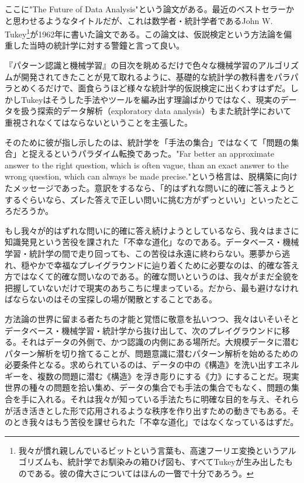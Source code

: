 ここに"The Future of Data Analysis"という論文がある。最近のベストセラーかと思わせるようなタイトルだが、これは数学者・統計学者であるJohn W. Tukey\footnote{我々が慣れ親しんでいるビットという言葉も、高速フーリエ変換というアルゴリズムも、統計学でお馴染みの箱ひげ図も、すべてTukeyが生み出したものである。彼の偉大さについてはほんの一瞥で十分であろう。}が1962年に書いた論文である。この論文は、仮説検定という方法論を偏重した当時の統計学に対する警鐘と言って良い。

『パターン認識と機械学習』の目次を眺めるだけで色々な機械学習のアルゴリズムが開発されてきたことが見て取れるように、基礎的な統計学の教科書をパラパラとめくるだけで、面食らうほど様々な統計学的仮説検定に出くわすはずだ。しかしTukeyはそうした手法やツールを編み出す理論ばかりではなく、現実のデータを扱う探索的データ解析（exploratory data analysis）もまた統計学において重視されなくてはならないということを主張した。

そのために彼が指し示したのは、統計学を「手法の集合」ではなくて「問題の集合」と捉えるというパラダイム転換であった。"Far better an approximate answer to the right question, which is often vague, than an exact answer to the wrong question, which can always be made precise."という格言は、脱構築に向けたメッセージであった。意訳をするなら、「的はずれな問いに的確に答えようとするぐらいなら、ズレた答えで正しい問いに挑む方がずっといい」といったところだろうか。

もし我々が的はずれな問いに的確に答え続けようとしているなら、我々はまさに知識発見という苦役を課された「不幸な道化」なのである。データベース・機械学習・統計学の間で走り回っても、この苦役は永遠に終わらない。悪夢から逃れ、穏やかで幸福なプレイグラウンドに辿り着くために必要なのは、的確な答え方ではなくて的確な問いなのである。的確な問いというのは、我々がまだ全貌を把握していないだけで現実のあちこちに埋まっている。だから、最も避けなければならないのはその宝探しの場が閑散とすることである。

方法論の世界に留まる者たちの才能と覚悟に敬意を払いつつ、我々はいそいそとデータベース・機械学習・統計学から抜け出して、次のプレイグラウンドに移る。それはデータの外側で、かつ認識の内側にある場所だ。大規模データに潜むパターン解析を切り捨てることが、問題意識に潜むパターン解析を始めるための必要条件となる。求められているのは、データの中の《構造》を洗い出すエネルギーを、複数の問題に潜む《構造》を浮き彫りにする《力》にすることだ。現実世界の種々の問題を拾い集め、データの集合でも手法の集合でもなく、問題の集合を手に入れる。それは我々が知っている手法たちに明確な目的を与え、それらが活き活きとした形で応用されるような秩序を作り出すための動きでもある。そのとき我々はもう苦役を課せられた「不幸な道化」ではなくなっているはずだ。

